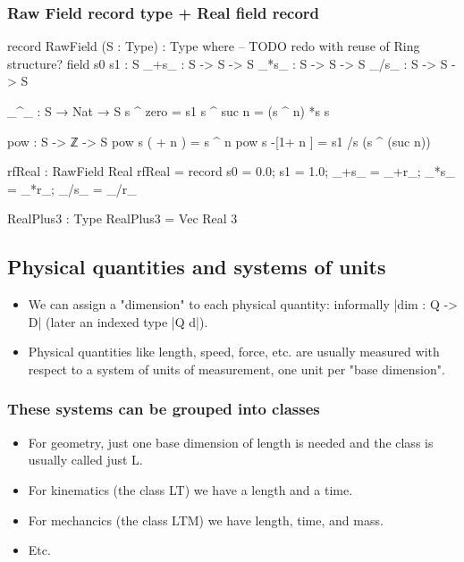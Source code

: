 \documentclass{article}
\begin{document}
\subsubsection{Raw Field record type + Real field record}
\label{sec:org04f9479}
\begin{code}
record RawField (S : Type) : Type where
  -- TODO redo with reuse of Ring structure?
  field
    s0 s1 : S
    _+s_ : S -> S -> S
    _*s_ : S -> S -> S
    _/s_ : S -> S -> S

  _^_ : S → Nat → S
  s ^ zero   = s1
  s ^ suc n  = (s ^ n) *s s

  pow : S -> ℤ -> S
  pow s  ( + n )  =        s ^ n
  pow s -[1+ n ]  = s1 /s (s ^ (suc n))

rfReal : RawField Real
rfReal = record {s0 = 0.0; s1 = 1.0; _+s_ = _+r_; _*s_ = _*r_; _/s_ = _/r_}

RealPlus3 : Type
RealPlus3 = Vec Real 3
\end{code}
\subsection{Physical quantities and systems of units}
\label{sec:orgb97e3b3}
\begin{itemize}
\item We can assign a "dimension" to each physical quantity:
informally |dim : Q -> D| (later an indexed type |Q d|).
\item Physical quantities like length, speed, force, etc. are usually
measured with respect to a system of units of measurement, one unit
per "base dimension".
\end{itemize}
\subsubsection{These systems can be grouped into classes}
\label{sec:org2870a1b}
\begin{itemize}
\item For geometry, just one base dimension of length is needed and the
class is usually called just L.
\item For kinematics (the class LT) we have a length and a time.
\item For mechancics (the class LTM) we have length, time, and mass.
\item Etc.
\end{itemize}
\end{document}
